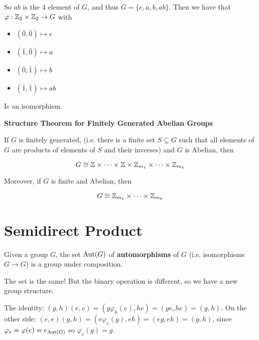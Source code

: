 \documentclass[12pt]{article}
\begin{document}
So $ab$ is the $4$ element of $G$, and thus $G = \{e, a, b, ab\}$. Then we have
that $\varphi: {\mathbb Z}_2 \times {\mathbb Z}_2 \to G$ with

\begin{itemize}
  \item $(\bar 0, \bar 0) \mapsto e$
  \item $(\bar 1, \bar 0) \mapsto a$
  \item $(\bar 0, \bar 1) \mapsto b$
  \item $(\bar 1, \bar 1) \mapsto ab$
\end{itemize}

Is an isomorphism.

{\bf Structure Theorem for Finitely Generated Abelian Groups}

If $G$ is finitely generated, (i.e. there is a finite set $S \subseteq G$ such
that all elements of $G$ are products of elements of $S$ and their inverses) and
$G$ is Abelian, then

\[
  G \cong {\mathbb Z} \times \cdots \times {\mathbb Z} \times {\mathbb Z}_{m_1} \times \cdots \times {\mathbb Z}_{m_k}
\]

Moreover, if $G$ is finite and Abelian, then

\[
  G \cong {\mathbb Z}_{m_1} \times \cdots \times {\mathbb Z}_{m_k}
\]


\section{Semidirect Product}

Given a group $G$, the set $\mathrm{Aut}(G)$ of {\bf automorphisms} of $G$ (i.e.
isomorphisms $G \to G$) is a group under composition.


The set is the same! But the binary operation is different, so we have a new
group structure.

The identity: $(g, h)(e, e) = (g \varphi_h(e), he) = (ge, he) = (g, h)$.
On the other side: $(e, e)(g, h) = (e \varphi_e(g), eh) = (eg, eh) = (g, h)$,
since $\varphi_e = \varphi(e) = e_{\mathrm{Aut}(G)}$ so $\varphi_e(g) = g$.
\end{document}
